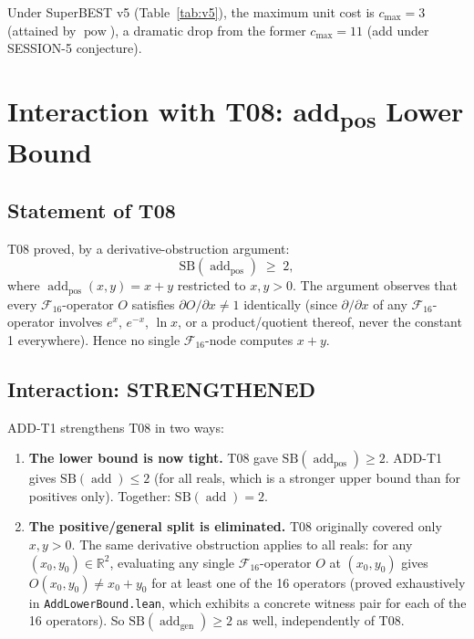 \documentclass[12pt,a4paper]{article}
\theoremstyle{definition}
\newcommand{\addop}{\operatorname{add}}
\newcommand{\powop}{\operatorname{pow}}
\newcommand{\SB}{\mathrm{SB}}
\newcommand{\F}{\mathcal{F}_{16}}
\newcommand{\R}{\mathbb{R}}
\newcommand{\Strengthened}{\textcolor{strengthened}{\textbf{STRENGTHENED}}}
\begin{document}
Under SuperBEST v5 (Table~\ref{tab:v5}), the maximum unit cost is
$c_{\max} = 3$ (attained by $\powop$), a dramatic drop from the
former $c_{\max} = 11$ (add under SESSION-5 conjecture).

\section{Interaction with T08: add\protect\textsubscript{pos} Lower Bound}
\label{sec:T08}

\subsection{Statement of T08}

T08 proved, by a derivative-obstruction argument:
\begin{equation}
  \SB(\addop_{\text{pos}}) \;\geq\; 2,
  \label{eq:T08}
\end{equation}
where $\addop_{\text{pos}}(x,y) = x+y$ restricted to $x,y>0$.
The argument observes that every $\F$-operator $O$ satisfies
$\partial O/\partial x \neq 1$ identically (since $\partial/\partial x$ of any
$\F$-operator involves $e^x$, $e^{-x}$, $\ln x$, or a product/quotient thereof,
never the constant 1 everywhere).  Hence no single $\F$-node computes $x+y$.

\subsection{Interaction: \Strengthened}

ADD-T1 strengthens T08 in two ways:

\begin{enumerate}
\item \textbf{The lower bound is now tight.}
  T08 gave $\SB(\addop_{\text{pos}}) \geq 2$.
  ADD-T1 gives $\SB(\addop) \leq 2$ (for all reals, which is a stronger upper
  bound than for positives only).  Together: $\SB(\addop) = 2$.

\item \textbf{The positive/general split is eliminated.}
  T08 originally covered only $x,y>0$.  The same derivative obstruction applies
  to all reals: for any $(x_0,y_0)\in\R^2$, evaluating any single $\F$-operator
  $O$ at $(x_0,y_0)$ gives $O(x_0,y_0)\neq x_0+y_0$ for at least one of the 16
  operators (proved exhaustively in \texttt{AddLowerBound.lean}, which exhibits
  a concrete witness pair for each of the 16 operators).
  So $\SB(\addop_{\text{gen}}) \geq 2$ as well, independently of T08.
\end{enumerate}
\end{document}
